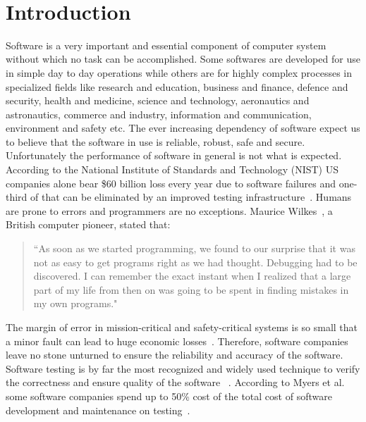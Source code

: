 \\
\chapter{Introduction}


Software is a very important and essential component of computer system without which no task can be accomplished. Some softwares are developed for use in simple day to day operations while others are for highly complex processes in specialized fields like research and education, business and finance, defence and security, health and medicine, science and technology, aeronautics and astronautics, commerce and industry, information and communication, environment and safety etc. The ever increasing dependency of software expect us to believe that the software in use is reliable, robust, safe and secure. Unfortunately the performance of software in general is not what is expected. According to the National Institute of Standards and Technology (NIST) US companies alone bear \$60 billion loss every year due to software failures and one-third of that can be eliminated by an improved testing infrastructure~\cite{Standards2002}. Humans are prone to errors and programmers are no exceptions. Maurice Wilkes~\cite{Maurice1985}, a British computer pioneer, stated that:
\begin{quote}
``As soon as we started programming, we found to our surprise that it was not as easy to get programs right as we had thought. Debugging had to be discovered. I can remember the exact instant when I realized that a large part of my life from then on was going to be spent in finding mistakes in my own programs."
\end{quote}

\noindent The margin of error in mission-critical and safety-critical systems is so small that a minor fault can lead to huge economic losses~\cite{huang2004securing}. Therefore, software companies leave no stone unturned to ensure the reliability and accuracy of the software. Software testing is by far the most recognized and widely used technique to verify the correctness and ensure quality of the software ~\cite{Myers2011, young2008software, patton2001software, Standards2002}.  According to Myers et al. some software companies spend up to 50\% cost of the total cost of software development and maintenance on testing~\cite{Myers2011}. 

